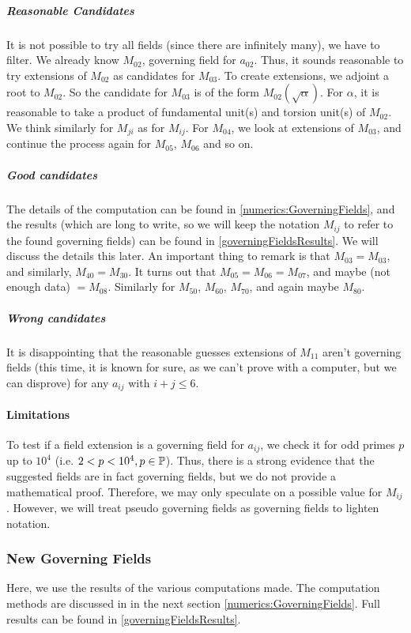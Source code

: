 \subparagraph{Reasonable Candidates}
It is not possible to try all fields (since there are infinitely many), we have to filter.
We already know $M_{02}$, governing field for $a_{02}$.
Thus, it sounds reasonable to try extensions of $M_{02}$ as candidates for $M_{03}$.
To create extensions, we adjoint a root to $M_{02}$.
So the candidate for $M_{03}$ is of the form $M_{02}\left( \sqrt{\alpha} \right)$.
For $\alpha$, it is reasonable to take a product of fundamental unit(s) and torsion unit(s) of $M_{02}$.
We think similarly for $M_{ji}$ as for $M_{ij}$.
For $M_{04}$, we look at extensions of $M_{03}$, and continue the process again for $M_{05}$, $M_{06}$ and so on.

\subparagraph{Good candidates}
The details of the computation can be found in \ref{numerics:GoverningFields}, and the results (which are long to write, so we will keep the notation $M_{ij}$ to refer to the found governing fields) can be found in \ref{governingFieldsResults}.
We will discuss the details this later.
An important thing to remark is that $M_{03} = M_{03}$, and similarly, $M_{40} = M_{30}$.
It turns out that $M_{05} = M_{06} = M_{07}$, and maybe (not enough data) $ = M_{08}$.
Similarly for $M_{50}$, $M_{60}$, $M_{70}$, and again maybe $M_{80}$.

\subparagraph{Wrong candidates}
It is disappointing that the reasonable guesses extensions of $M_{11}$ aren't governing fields (this time, it is known for sure, as we can't prove with a computer, but we can disprove) for any $a_{ij}$ with $i+j \leq 6$.

\paragraph{Limitations}
To test if a field extension is a governing field for $a_{ij}$, we check it for odd primes $p$ up to $10^4$ (i.e. $2 < p <10^4, p \in \mathbb{P}$).
Thus, there is a strong evidence that the suggested fields are in fact governing fields, but we do not provide a mathematical proof.
Therefore, we may only speculate on a possible value for $M_{ij}$.
However, we will treat pseudo governing fields as governing fields to lighten notation.

\subsubsection{New Governing Fields}
Here, we use the results of the various computations made.
The computation methods are discussed in in the next section \ref{numerics:GoverningFields}.
Full results can be found in \ref{governingFieldsResults}.

